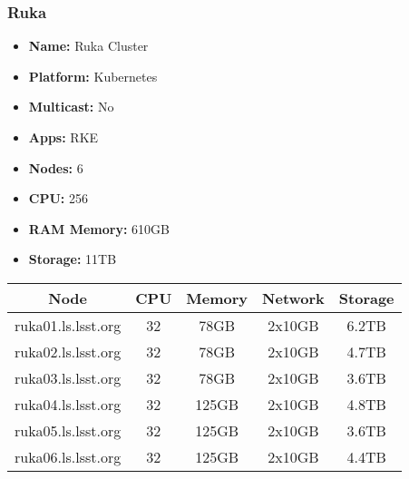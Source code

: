 \newpage
\subsubsection{Ruka}
\begin{itemize}
  \itemsep0em 
  \item \textbf{Name:}       Ruka Cluster
  \item \textbf{Platform:}   Kubernetes
  \item \textbf{Multicast:}  No
  \item \textbf{Apps:}       RKE
  \item \textbf{Nodes:}      6
  \item \textbf{CPU:}        256
  \item \textbf{RAM Memory:} 610GB
  \item \textbf{Storage:}   11TB
\end{itemize}
\begin{center}
  \small
  \begin{tabular}{||c c c c c||}
    \hline
    \textbf{Node} & \textbf{CPU} & \textbf{Memory} & \textbf{Network} & \textbf{Storage} \\ [0.5ex]
    \hline
    ruka01.ls.lsst.org & 32 & 78GB & 2x10GB & 6.2TB \\
    \hline
    ruka02.ls.lsst.org & 32 & 78GB & 2x10GB & 4.7TB \\
    \hline
    ruka03.ls.lsst.org & 32 & 78GB & 2x10GB & 3.6TB \\
    \hline
    ruka04.ls.lsst.org & 32 & 125GB & 2x10GB & 4.8TB \\
    \hline
    ruka05.ls.lsst.org & 32 & 125GB & 2x10GB & 3.6TB \\
    \hline
    ruka06.ls.lsst.org & 32 & 125GB & 2x10GB & 4.4TB \\
    \hline
  \end{tabular}
\end{center}

\newpage
